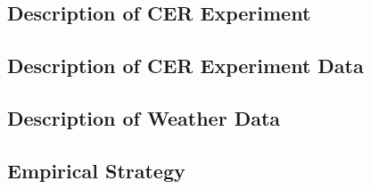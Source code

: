 \subsection{Description of CER Experiment}
\label{SubSection:Description-of-CER-Experiment}



\subsection{Description of CER Experiment Data}
\label{SubSection:Description-of-CER-Experiment-Data}



\subsection{Description of Weather Data}
\label{SubSection:Description-of-Weather-Data}



\subsection{Empirical Strategy}
\label{SubSection:Empirical-Strategy}

